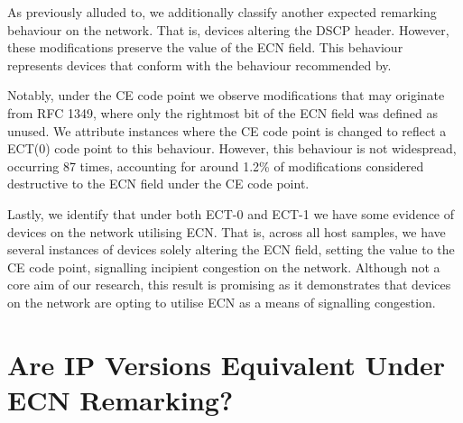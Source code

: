 \documentclass{l4proj}
\begin{document}
As previously alluded to, we additionally classify another expected remarking behaviour on the network. That is, devices altering the DSCP header. However, these modifications preserve the value of the ECN field. This behaviour represents devices that conform with the behaviour recommended by\cite{rfc3168}.

Notably, under the CE code point we observe modifications that may originate from RFC 1349\cite{rfc1349}, where only the rightmost bit of the ECN field was defined as unused. We attribute instances where the CE code point is changed to reflect a ECT(0) code point to this behaviour. However, this behaviour is not widespread, occurring 87 times,  accounting for around 1.2\% of modifications considered destructive to the ECN field under the CE code point.

Lastly, we identify that under both ECT-0 and ECT-1 we have some evidence of devices on the network utilising ECN. That is, across all host samples, we have several instances of devices solely altering the ECN field, setting the value to the CE code point, signalling incipient congestion on the network. Although not a core aim of our research, this result is promising as it demonstrates that devices on the network are opting to utilise ECN as a means of signalling congestion.




\section{Are IP Versions Equivalent Under ECN Remarking?}
\end{document}
